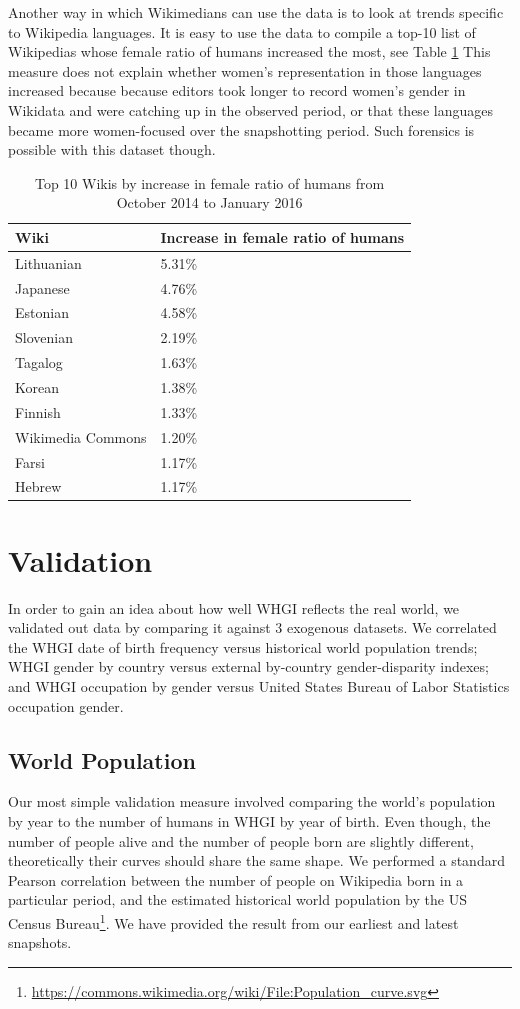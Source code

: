 \documentclass[letterpaper]{article}
\begin{document}
Another way in which Wikimedians can use the data is to look at trends specific to Wikipedia languages. It is easy to use the data to compile a top-10 list of Wikipedias whose female ratio of humans increased the most, see Table \ref{table:top10} This measure does not explain whether women's representation in those languages increased because because editors took longer to record women's gender in Wikidata and were catching up in the observed period, or that these languages became more women-focused over the snapshotting period. Such forensics is possible with this dataset though.

\begin{table}
\caption{Top 10 Wikis by increase in female ratio of humans from October 2014 to January 2016}
\label{table:top10}
\begin{tabular}{p{2cm}p{2cm}}
\toprule
{Wiki} &     Increase in female ratio of humans  \\
\midrule
Lithuanian      & 5.31\% \\
Japanese     & 4.76\% \\
Estonian      & 4.58\% \\
Slovenian      & 2.19\% \\
Tagalog      & 1.63\% \\
Korean      & 1.38\% \\
Finnish      & 1.33\% \\
Wikimedia Commons & 1.20\% \\
Farsi      & 1.17\% \\
Hebrew      & 1.17\% \\
\bottomrule
\end{tabular}


\end{table}

\section{Validation}
In order to gain an idea about how well WHGI reflects the real world, we validated out data by comparing it against 3 exogenous datasets. We correlated the WHGI date of birth frequency versus historical world population trends; WHGI gender by country versus external by-country gender-disparity indexes; and WHGI occupation by gender versus United States Bureau of Labor Statistics occupation gender.

\subsection{World Population} Our most simple validation measure involved
comparing the world's population by year to the number of humans in WHGI by
year of birth. Even though, the number of people alive and the number of people
born are slightly different, theoretically their curves should share the same
shape. We performed a standard Pearson correlation between the number of people
on Wikipedia born in a particular period, and the estimated historical world
population by the US Census
Bureau\footnote{\url{https://commons.wikimedia.org/wiki/File:Population_curve.svg}}.
We have provided the result from our earliest and latest snapshots.
\end{document}
